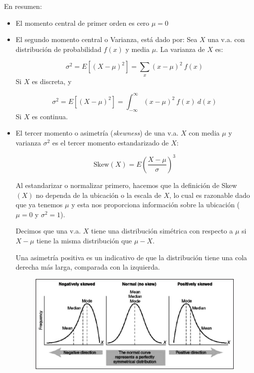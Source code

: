 En resumen:
\begin{itemize}
\item El momento central de primer orden es cero $\mu = 0$

  
\item El segundo momento central o Varianza, está dado por:
Sea $X$ una v.a. con distribución de probabilidad $f(x)$ y media $\mu$. La
varianza de $X$ es:

\begin{equation}
  \sigma^2 = E[(X-\mu)^2] = \sum_{x}(x-\mu)^2 \ f(x)
\end{equation}
Si $X$ es discreta, y 

\begin{equation}
  \sigma^2 = E[(X-\mu)^2] = \int_{-\infty}^{\infty}(x-\mu)^2 \ f(x) \ d(x)
\end{equation}
Si $X$ es continua.

\item El tercer momento o asimetría (\textit{skewness}) de una v.a. $X$ con
media $\mu$ y varianza $\sigma^2$ es el tercer momento estandarizado de $X$:
  
\begin{equation}
  \text{Skew}(X) = E(\frac{X-\mu}{\sigma})^3
\end{equation}
  
Al estandarizar o normalizar primero, hacemos que la definición de Skew$(X)$ no
dependa de la ubicación o la escala de $X$, lo cual es razonable dado que ya
tenemos $\mu$ y esta nos proporciona información sobre la ubicación ($\mu = 0$ y
$\sigma^2 = 1$).

Decimos que una v.a. $X$ tiene una distribución simétrica con respecto a $\mu$
si $X-\mu$ tiene la misma distribución que $\mu-X$.

Una asimetría positiva es un indicativo de que la distribución tiene una cola
derecha más larga, comparada con la izquierda. 
  
    \begin{figure}[h!]
      \centering
      \includegraphics[scale=0.5]{../slides/figures/different_skewness.png}
    \end{figure}
  

\end{itemize}

